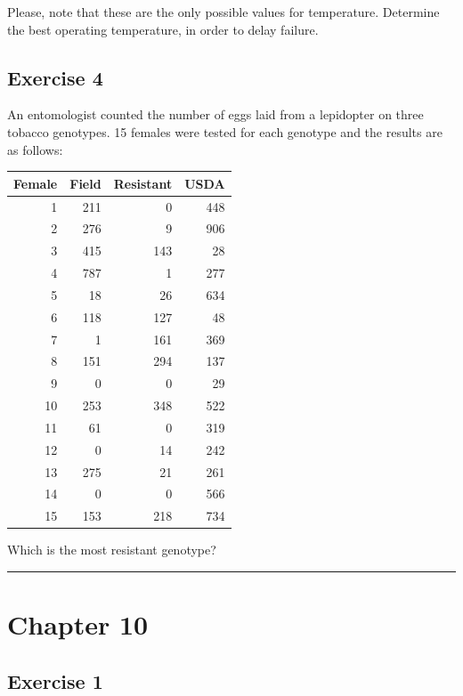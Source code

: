 \documentclass[a4paper,12pt,oneside]{book}
\begin{document}
Please, note that these are the only possible values for temperature. Determine the best operating temperature, in order to delay failure.

\hypertarget{exercise-4-2}{%
\subsection{Exercise 4}\label{exercise-4-2}}

An entomologist counted the number of eggs laid from a lepidopter on three tobacco genotypes. 15 females were tested for each genotype and the results are as follows:

\begin{longtable}[]{@{}rrrr@{}}
\toprule
Female & Field & Resistant & USDA \\
\midrule
\endhead
1 & 211 & 0 & 448 \\
2 & 276 & 9 & 906 \\
3 & 415 & 143 & 28 \\
4 & 787 & 1 & 277 \\
5 & 18 & 26 & 634 \\
6 & 118 & 127 & 48 \\
7 & 1 & 161 & 369 \\
8 & 151 & 294 & 137 \\
9 & 0 & 0 & 29 \\
10 & 253 & 348 & 522 \\
11 & 61 & 0 & 319 \\
12 & 0 & 14 & 242 \\
13 & 275 & 21 & 261 \\
14 & 0 & 0 & 566 \\
15 & 153 & 218 & 734 \\
\bottomrule
\end{longtable}

Which is the most resistant genotype?

\begin{center}\rule{0.5\linewidth}{0.5pt}\end{center}

\hypertarget{chapter-10}{%
\section{Chapter 10}\label{chapter-10}}

\hypertarget{exercise-1-5}{%
\subsection{Exercise 1}\label{exercise-1-5}}
\end{document}
